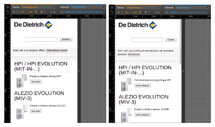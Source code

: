 \documentclass[a4paper,11pt,twoside]{report}
\begin{document}
\begin{description}
\begin{center}
	\includegraphics[width=200]{images/DDTH_home_be_nl.png} 
	\includegraphics[width=200]{images/DDTH_home_ru.png} 

\end{center}
\end{description}
\end{document}
